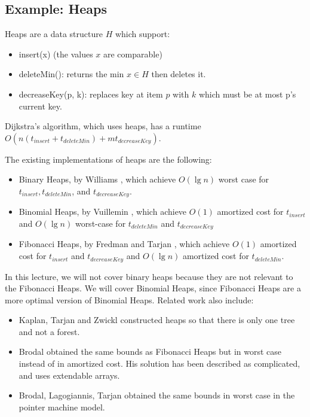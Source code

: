 \documentclass[11pt]{article}
\begin{document}
\subsection{Example: Heaps}

Heaps are a data structure $H$ which support:
\begin{itemize}
\item insert(x) (the values $x$ are comparable)
\item deleteMin(): returns the min $x \in H$ then deletes it.
\item decreaseKey(p, k): replaces key at item $p$ with $k$ which must be at most p's current key.
\end{itemize}

Dijkstra's algorithm, which uses heaps, has a runtime $O(n (t_{insert} + t_{deleteMin}) + m t_{decreaseKey})$.

The existing implementations of heaps are the following:
\begin{itemize}
 \item Binary Heaps, by Williams \cite{heap}, which achieve $O(\lg n)$ worst case for
$ t_{insert}, t_{deleteMin}$, and  $t_{decreaseKey}$.
 
 \item Binomial Heaps, by Vuillemin \cite{bheap}, which achieve $O(1)$
 amortized cost for $t_{insert}$ and $O(\lg n)$ worst-case for $t_{deleteMin}$ and $t_{decreaseKey}$
 
 \item Fibonacci Heaps, by Fredman and Tarjan \cite{fheap}, which achieve $O(1)$ amortized cost for $t_{insert}$ and $t_{decreaseKey}$ and  $O(\lg n)$ amortized cost for $t_{deleteMin}$.
 \end{itemize}
 
 In this lecture, we will not cover binary heaps because they are not relevant to the Fibonacci Heaps. We will cover Binomial Heaps, since Fibonacci Heaps are a more optimal version of Binomial Heaps. Related work also include:
 
 \begin{itemize}
 
 \item Kaplan, Tarjan and Zwickl \cite{kaplan} constructed heaps so that there is only one tree and not a forest.
 
 \item Brodal \cite{brodal} obtained the same bounds as Fibonacci Heaps but in worst case instead of in amortized cost. His solution has been described as complicated, and uses extendable arrays.
 
 \item  Brodal, Lagogiannis, Tarjan \cite{brodal2} obtained the same bounds in worst case in the pointer machine model.

\end{itemize}
\end{document}
